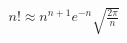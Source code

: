 \documentclass[preview]{standalone}
\begin{document}
\begin{align*}
n! \approx n^{n+1} e^{-n} \sqrt{\frac{2\pi}{n}}
\end{align*}
\end{document}
